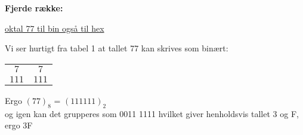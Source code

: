 \textbf{Fjerde række:}

\underline{oktal 77 til bin også til hex}

Vi ser hurtigt fra tabel 1 at tallet 77 kan skrives som binært:
\begin{table}[!htbp]
	\centering
	\begin{tabular}{cc}
		$7$&$7$\\ 
		$111$&$111$\\ 
	\end{tabular}
\end{table}

Ergo $(77)_{8}$ = $(111 111)_{2}$\\ og igen kan det grupperes som 0011 1111 hvilket giver henholdsvis tallet 3 og F, ergo 3F


